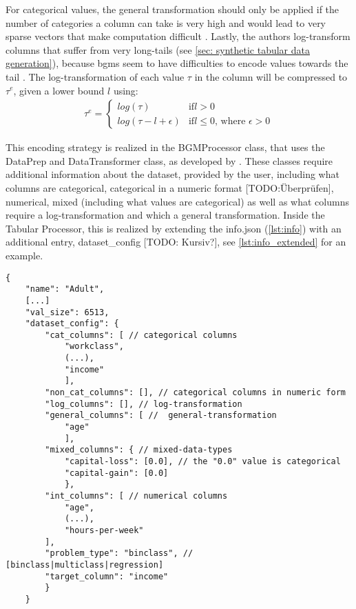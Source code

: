 For categorical values, the general transformation should only be applied if the number of categories a column can take is very high and would lead to very sparse vectors that make computation difficult \cite{zhao2022CTABGANEnhancingTabular}.
Lastly, the authors log-transform columns that suffer from very long-tails (see \autoref{sec: synthetic tabular data generation}), because \Glspl{bgm} seem to have difficulties to encode values towards the tail \cite{zhao2022CTABGANEnhancingTabular}.
The log-transformation of each value $\tau$ in the column will be compressed to $\tau^e$, given a lower bound $l$ using:
\begin{equation}
    \label{eqn:log-transform}
    \begin{align*}
        \tau^e = 
        \begin{cases}
            log(\tau) &\text{if} l>0\\
            log(\tau-l+\epsilon) &\text{if} l\leq0 \text{, where } \epsilon > 0
        \end{cases}
    \end{align*}
\end{equation}

This encoding strategy is realized in the BGMProcessor class, that uses the DataPrep and DataTransformer class, as developed by \cite{zhao2022CTABGANEnhancingTabular}.
These classes require additional information about the dataset, provided by the user, including what columns are categorical, categorical in a numeric format [TODO:Überprüfen], numerical, mixed (including what values are categorical) as well as what columns require a log-transformation and which a general transformation.
Inside the Tabular Processor, this is realized by extending the info.json (\autoref{lst:info}) with an additional entry, dataset\_config [TODO: Kursiv?], see \autoref{lst:info_extended} for an example.

\begin{lstlisting}[label={lst:info_extended},caption={Example extended data info file}]
    {
    "name": "Adult",
    [...]
    "val_size": 6513,
    "dataset_config": {
        "cat_columns": [ // categorical columns
            "workclass", 
            (...), 
            "income"
            ],
        "non_cat_columns": [], // categorical columns in numeric form
        "log_columns": [], // log-transformation
        "general_columns": [ //  general-transformation
            "age"
            ], 
        "mixed_columns": { // mixed-data-types
            "capital-loss": [0.0], // the "0.0" value is categorical           
            "capital-gain": [0.0]
            },
        "int_columns": [ // numerical columns 
            "age", 
            (...), 
            "hours-per-week"
        ],
        "problem_type": "binclass", // [binclass|multiclass|regression]
        "target_column": "income"
        }
    }
\end{lstlisting}

